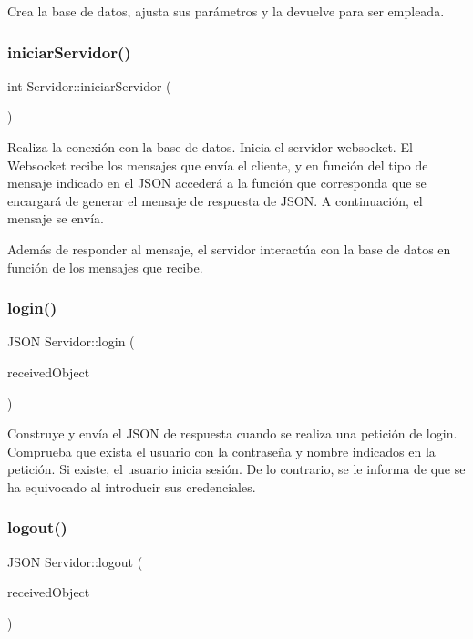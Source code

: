 Crea la base de datos, ajusta sus parámetros y la devuelve para ser empleada. \mbox{\label{classServidor_a2a7fdca08064f9e567c579a2cb34f267}} 
\subsubsection{\texorpdfstring{iniciar\+Servidor()}{iniciarServidor()}}
{\footnotesize\ttfamily int Servidor\+::iniciar\+Servidor (\begin{DoxyParamCaption}{ }\end{DoxyParamCaption})}

Realiza la conexión con la base de datos. Inicia el servidor websocket. El Websocket recibe los mensajes que envía el cliente, y en función del tipo de mensaje indicado en el J\+S\+ON accederá a la función que corresponda que se encargará de generar el mensaje de respuesta de J\+S\+ON. A continuación, el mensaje se envía.

Además de responder al mensaje, el servidor interactúa con la base de datos en función de los mensajes que recibe. \mbox{\label{classServidor_afa99d1a7d42e43c66c066aa8d4622fbf}} 
\subsubsection{\texorpdfstring{login()}{login()}}
{\footnotesize\ttfamily J\+S\+ON Servidor\+::login (\begin{DoxyParamCaption}\item[{J\+S\+ON}]{received\+Object }\end{DoxyParamCaption})}

Construye y envía el J\+S\+ON de respuesta cuando se realiza una petición de login. Comprueba que exista el usuario con la contraseña y nombre indicados en la petición. Si existe, el usuario inicia sesión. De lo contrario, se le informa de que se ha equivocado al introducir sus credenciales. \mbox{\label{classServidor_a612baa3e7a827632a48aacdc024e2a20}} 
\subsubsection{\texorpdfstring{logout()}{logout()}}
{\footnotesize\ttfamily J\+S\+ON Servidor\+::logout (\begin{DoxyParamCaption}\item[{J\+S\+ON}]{received\+Object }\end{DoxyParamCaption})}

